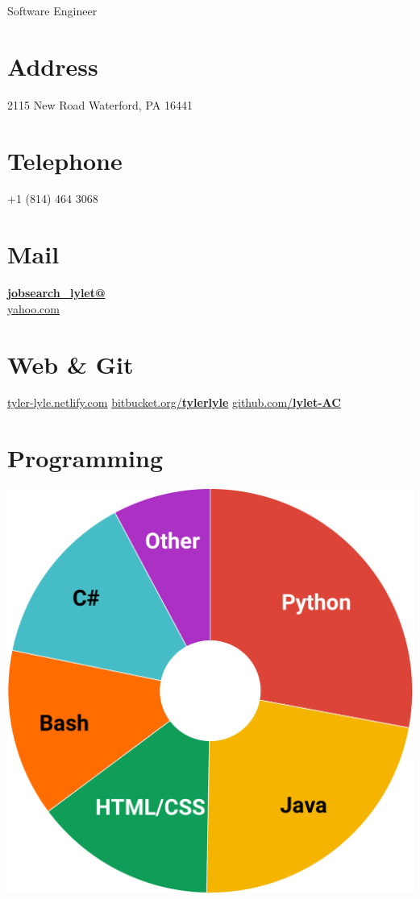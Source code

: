 \documentclass[]{friggeri-cv}
\begin{document}
      {Software Engineer}
      

\begin{aside}
  \section{Address}
    2115 New Road
    Waterford, PA 16441
    ~
  \section{Telephone}
    +1 (814) 464 3068
    ~
  \section{Mail}
    \href{mailto:}{\textbf{jobsearch\_lylet@}\\yahoo.com}
    ~
  \section{Web \& Git}
    \href{https://tyler-lyle.netlify.com/}{tyler-lyle.netlify.com}
    \href{https://bitbucket.org/tylerlyle}{bitbucket.org/\textbf{tylerlyle}}
    \href{https://github.com/lylet-AC}{github.com/\textbf{lylet-AC}}
    ~
  \section{Programming}
    \includegraphics[scale=0.18]{img/pvl.pdf}
    ~

\end{aside}
\end{document}
